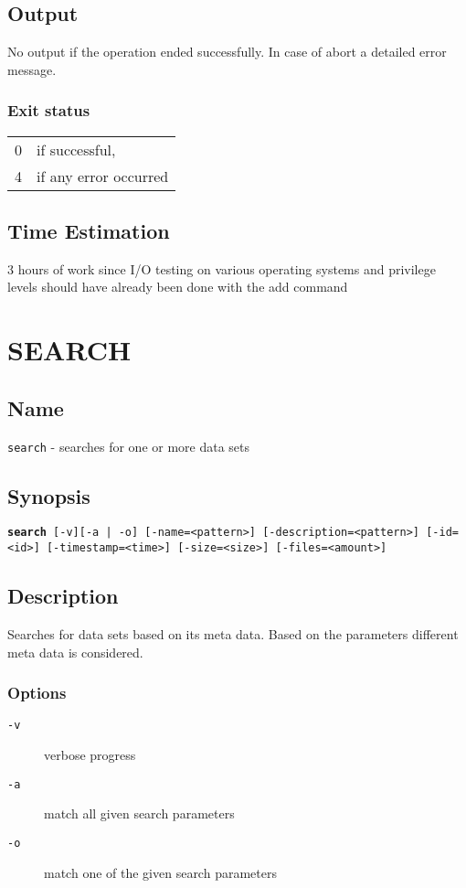\documentclass{article} %
\begin{document}
		\subsection*{Output}
		No output if the operation ended successfully. In case of abort a detailed error message.
		\subsubsection*{Exit status}
		\begin{tabular}{ll}
			0 &  if successful,\\ 
			4 &  if any error occurred\\
		\end{tabular}
				\subsection*{Time Estimation}
				3 hours of work since I/O testing on various operating systems and privilege levels should have already been done with the add command \\
				\noindent
		\newpage
		
		\section*{SEARCH}
		\subsection*{Name}
		\texttt{search} - searches for one or more data sets
		\subsection*{Synopsis}
		\texttt{\textbf{search} [-v][-a | -o] [-name=<pattern>] [-description=<pattern>] [-id=<id>] [-timestamp=<time>] [-size=<size>] [-files=<amount>]}
		\subsection*{Description}
		Searches for data sets based on its meta data. Based on the parameters different meta data is considered.\\
		
		\noindent
		\subsubsection*{Options}
		\begin{description}
			\item[\texttt{-v}] verbose progress
			\item[\texttt{-a}] match all given search parameters
			\item[\texttt{-o}] match one of the given search parameters
		\end{description}
		
\end{document}
